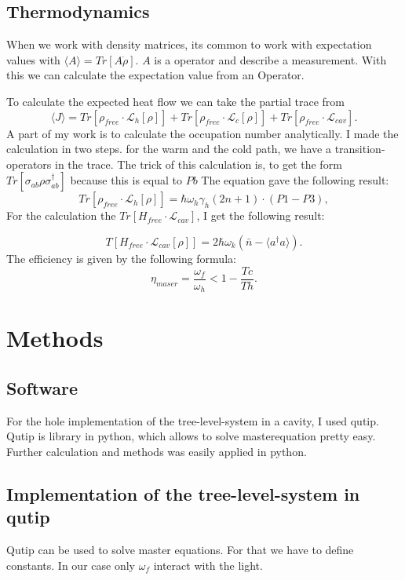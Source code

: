 \documentclass[12pt,a4paper]{article}
\begin{document}
\subsection{Thermodynamics}
 When we work with density matrices, its common to work with expectation values with $\langle A \rangle=Tr[A\dot{\rho}]$.
 $A$ is a operator and describe a measurement.
With this we can calculate the expectation value from an Operator. 

To calculate the expected heat flow we can take the partial trace from 
\begin{equation}
\langle J\rangle=Tr[\rho_{free}\cdot \mathcal{L}_h[\rho]]+Tr[\rho_{free}\cdot \mathcal{L}_c[\rho]]+Tr[\rho_{free}\cdot \mathcal{L}_{cav}].
\end{equation}
A part of my work is to calculate the occupation number analytically. 
I made the calculation in two steps. for the warm and the cold path, we have a transition-operators in the trace.
The trick of this calculation is, to get the form $Tr[\sigma_{ab}\rho \sigma_{ab}^{\dag{}}]$ because this is equal to $Pb$
The equation gave the following result:
\begin{equation}
Tr[\rho_{free}\cdot \mathcal{L}_h[\rho]]=\hbar \omega_h \gamma_h (2n+1) \cdot( P1-P3) ,
\end{equation}
For the calculation the $Tr[H_{free}\cdot \mathcal{L}_{cav}]$, I get the following result:

\begin{equation}
T[H_{free}\cdot \mathcal{L}_{cav}[\rho]]=2\hbar \omega_k (\bar{n}-\langle a^{\dag{}}a \rangle).
\end{equation}
The efficiency is given by the following formula:
\begin{equation}
\eta_{maser}=\frac{\omega_f}{\omega_h}<1-\frac{Tc}{Th}.
\end{equation}



\section{Methods}
\subsection{Software}
For the hole implementation of the tree-level-system in a cavity, I used qutip. Qutip is library in python, which allows to solve masterequation pretty easy.
Further calculation and methods was easily applied in python. 
\subsection{Implementation of the tree-level-system in qutip}
Qutip can be used to solve master equations. For that we have to define constants.  
In our case only $\omega_f$ interact with the light. 
\end{document}
